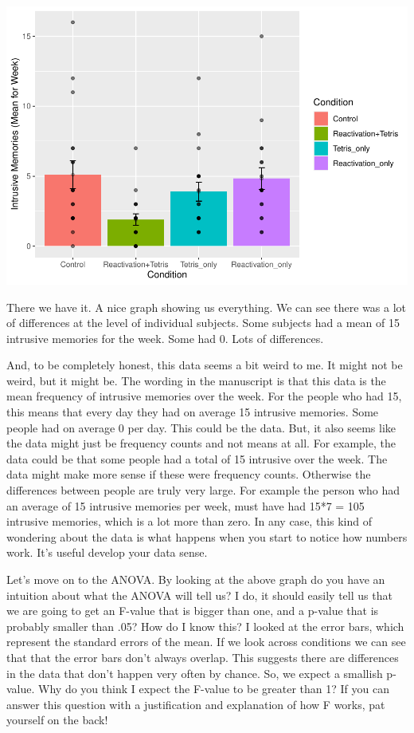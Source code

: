 \documentclass[
]{book}
\begin{document}
\includegraphics{Statistics_Lab_files/figure-latex/unnamed-chunk-392-1.pdf}

There we have it. A nice graph showing us everything. We can see there was a lot of differences at the level of individual subjects. Some subjects had a mean of 15 intrusive memories for the week. Some had 0. Lots of differences.

And, to be completely honest, this data seems a bit weird to me. It might not be weird, but it might be. The wording in the manuscript is that this data is the mean frequency of intrusive memories over the week. For the people who had 15, this means that every day they had on average 15 intrusive memories. Some people had on average 0 per day. This could be the data. But, it also seems like the data might just be frequency counts and not means at all. For example, the data could be that some people had a total of 15 intrusive over the week. The data might make more sense if these were frequency counts. Otherwise the differences between people are truly very large. For example the person who had an average of 15 intrusive memories per week, must have had 15*7 = 105 intrusive memories, which is a lot more than zero. In any case, this kind of wondering about the data is what happens when you start to notice how numbers work. It's useful develop your data sense.

Let's move on to the ANOVA. By looking at the above graph do you have an intuition about what the ANOVA will tell us? I do, it should easily tell us that we are going to get an F-value that is bigger than one, and a p-value that is probably smaller than .05? How do I know this? I looked at the error bars, which represent the standard errors of the mean. If we look across conditions we can see that that the error bars don't always overlap. This suggests there are differences in the data that don't happen very often by chance. So, we expect a smallish p-value. Why do you think I expect the F-value to be greater than 1? If you can answer this question with a justification and explanation of how F works, pat yourself on the back!
\end{document}
